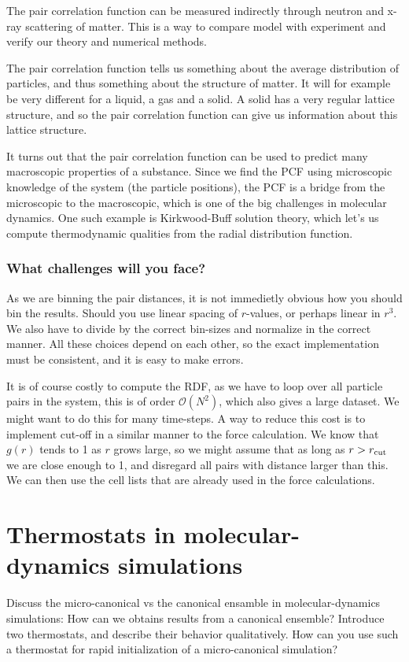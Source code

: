 \documentclass[a4paper, 11pt, notitlepage, english]{article}
\begin{document}
The pair correlation function can be measured indirectly through neutron and x-ray scattering of matter. This is a way to compare model with experiment and verify our theory and numerical methods.

The pair correlation function tells us something about the average distribution of particles, and thus something about the structure of matter. It will for example be very different for a liquid, a gas and a solid. A solid has a very regular lattice structure, and so the pair correlation function can give us information about this lattice structure.

It turns out that the pair correlation function can be used to predict many macroscopic properties of a substance. Since we find the PCF using microscopic knowledge of the system (the particle positions), the PCF is a bridge from the microscopic to the macroscopic, which is one of the big challenges in molecular dynamics. One such example is Kirkwood-Buff solution theory, which let's us compute thermodynamic qualities from the radial distribution function.

\subsubsection*{What challenges will you face?}

As we are binning the pair distances, it is not immedietly obvious how you should bin the results. Should you use linear spacing of $r$-values, or perhaps linear in $r^3$. We also have to divide by the correct bin-sizes and normalize in the correct manner. All these choices depend on each other, so the exact implementation must be consistent, and it is easy to make errors.

It is of course costly to compute the RDF, as we have to loop over all particle pairs in the system, this is of order $\mathcal{O}(N^2)$, which also gives a large dataset. We might want to do this for many time-steps. A way to reduce this cost is to implement cut-off in a similar manner to the force calculation. We know that $g(r)$ tends to 1 as $r$ grows large, so we might assume that as long as $r > r_{\rm cut}$ we are close enough to 1, and disregard all pairs with distance larger than this. We can then use the cell lists that are already used in the force calculations.

\clearpage


\section{Thermostats in molecular-dynamics simulations}
Discuss the micro-canonical vs the canonical ensamble in molecular-dynamics simulations: How can we obtains results from a canonical ensemble? Introduce two thermostats, and describe their behavior qualitatively. How can you use
such a thermostat for rapid initialization of a micro-canonical simulation?
\end{document}
